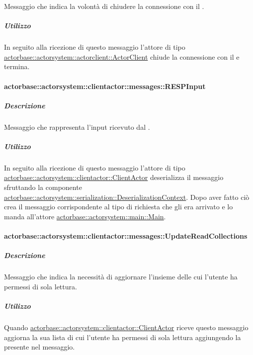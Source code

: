 \documentclass{scalatekids-article}
\begin{document}
Messaggio che indica la volontà di chiudere la connessione con il .

\subparagraph{Utilizzo}

In seguito alla ricezione di questo messaggio l'attore di tipo
\hyperref[sec:actorbase::actorsystem::actorclient::ActorClient]{actorbase::actorsystem::actorclient::ActorClient}
chiude la connessione con il  e termina.

\paragraph{actorbase::actorsystem::clientactor::messages::RESPInput}
\label{sec:actorbase::actorsystem::clientactor::messages::RESPInput}

\subparagraph{Descrizione}

Messaggio che rappresenta l'input ricevuto dal .

\subparagraph{Utilizzo}

In seguito alla ricezione di questo messaggio l'attore di tipo
\hyperref[sec:actorbase::actorsystem::clientactor::ClientActor]{actorbase::actorsystem::clientactor::ClientActor}
deserializza il messaggio sfruttando la componente
\hyperref[sec:actorbase::actorsystem::serialization::DeserializationContext]{actorbase::actorsystem::serialization::DeserializationContext}.
Dopo aver fatto ciò crea il messaggio corrispondente al tipo di richiesta che gli era arrivato
e lo manda all'attore \hyperref[sec:actorbase::actorsystem::main::Main]{actorbase::actorsystem::main::Main}.

\paragraph{actorbase::actorsystem::clientactor::messages::UpdateReadCollections}
\label{sec:actorbase::actorsystem::clientactor::messages::UpdateReadCollections}

\subparagraph{Descrizione}

Messaggio che indica la necessità di aggiornare l'insieme delle
 cui l'utente ha permessi di sola lettura.

\subparagraph{Utilizzo}

Quando \hyperref[sec:actorbase::actorsystem::clientactor::ClientActor]{actorbase::actorsystem::clientactor::ClientActor}
riceve questo messaggio aggiorna la sua lista di 
cui l'utente ha permessi di sola lettura aggiungendo la
 presente nel messaggio.
\end{document}
